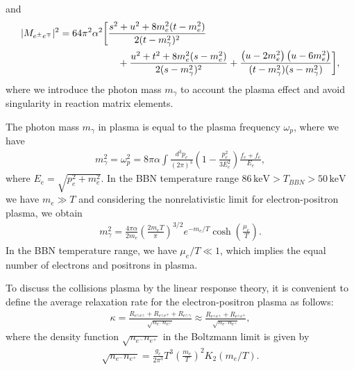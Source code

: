 and
\begin{align}
|M_{e^\pm e^\mp}|^{2}=64\pi^{2}\alpha^{2}
\bigg[&\frac{s^{2}+u^{2}+8m_e^{2}(t-m_e^{2})}{2(t-m^2_{\gamma})^{2}}\notag\\
&\quad+\frac{u^{2}+t^{2}+8m_e^{2}
(s-m_e^{2})}{2(s-m^2_{\gamma})^{2}}  +   \frac{\left({u}-2m_e^{2}\right)\left({u}-6m_e^{2}\right)}
   {(t-m^2_{\gamma})(s-m^2_{\gamma})} \bigg],
\label{M_fi_b}
\end{align}
where we introduce the photon mass $m_\gamma$ to account the plasma effect and avoid singularity in reaction matrix elements. 

The photon mass $m_\gamma$ in plasma is equal to the plasma frequency $\omega_p$, where we have~\cite{Kislinger:1975uy}
\begin{align}
m^2_\gamma=\omega^2_{p}=8\pi\alpha\int\frac{d^3p_e}{(2\pi)^3}\left(1-\frac{p_e^2}{3E_e^2}\right)\frac{f_e+f_{\bar e}}{E_e},
\end{align}
where $E_e=\sqrt{p_e^2+m^2_e}$. In the BBN temperature range $86\,\mathrm{keV}>T_{BBN}>50\,\mathrm{keV}$ we have $m_e\gg T$ and considering the nonrelativistic limit for electron-positron plasma, we obtain
\begin{align}
m^2_\gamma=\frac{4\pi\alpha}{2m_e}\left(\frac{2m_eT}{\pi}\right)^{3/2}e^{-m_e/T}\cosh\left(\frac{\mu_e}{T}\right).
\end{align}
In the BBN temperature range, we have $\mu_e/T\ll1$, which implies the equal number of electrons and positrons in plasma.

To discuss the collisions plasma by the linear response theory, it is convenient to define the average relaxation rate for the electron-positron plasma as follows:
\begin{align}\label{Kappa}
\kappa=\frac{R_{e^\pm e^\pm}+R_{e^\pm e^\mp}+R_{e^\pm\gamma}}{\sqrt{n_{e^-}n_{e^+}}}\approx\frac{R_{e^\pm e^\pm}+R_{e^\pm e^\mp}}{\sqrt{n_{e^-}n_{e^+}}},
\end{align}
where the density function ${\sqrt{n_{e^-}n_{e^+}}}$ in the Boltzmann limit is given by
\begin{align}
{\sqrt{n_{e^-}n_{e^+}}}=\frac{g_e}{2\pi^3}T^3\left(\frac{m_e}{T}\right)^2K_2(m_e/T).
\end{align}

